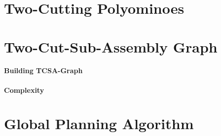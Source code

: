 \section{Two-Cutting Polyominoes}
\label{sec:twocutting}





\section{Two-Cut-Sub-Assembly Graph}
\label{sec:tcsa}


\paragraph{Building TCSA-Graph}


\paragraph{Complexity}





\section{Global Planning Algorithm}
\label{sec:global_algo}

